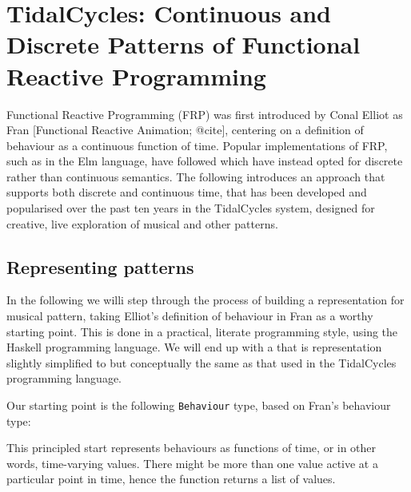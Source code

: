\section{TidalCycles: Continuous and Discrete Patterns of Functional
Reactive
Programming}\label{tidalcycles-continuous-and-discrete-patterns-of-functional-reactive-programming}

Functional Reactive Programming (FRP) was first introduced by Conal
Elliot as Fran {[}Functional Reactive Animation; @cite{]}, centering on
a definition of behaviour as a continuous function of time. Popular
implementations of FRP, such as in the Elm language, have followed which
have instead opted for discrete rather than continuous semantics. The
following introduces an approach that supports both discrete and
continuous time, that has been developed and popularised over the past
ten years in the TidalCycles system, designed for creative, live
exploration of musical and other patterns.

\subsection{Representing patterns}\label{representing-patterns}

In the following we willi step through the process of building a
representation for musical pattern, taking Elliot's definition of
behaviour in Fran as a worthy starting point. This is done in a
practical, literate programming style, using the Haskell programming
language. We will end up with a that is representation slightly
simplified to but conceptually the same as that used in the TidalCycles
programming language.

Our starting point is the following \texttt{Behaviour} type, based on
Fran's behaviour type:

\begin{Shaded}
\begin{Highlighting}[]
  \OtherTok{=} 
 \OtherTok{=}  \OtherTok{{-}\textgreater{}}\NormalTok{ [a]}
\end{Highlighting}
\end{Shaded}

This principled start represents behaviours as functions of time, or in
other words, time-varying values. There might be more than one value
active at a particular point in time, hence the function returns a list
of values.

